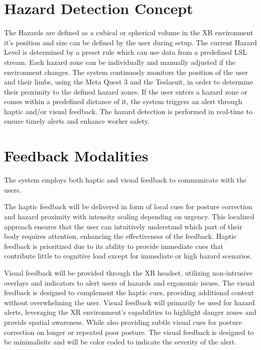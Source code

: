 \section{Hazard Detection Concept}
The Hazards are defined as a cubical or spherical volume in the XR environment it's position and size can be defined by the user during setup. The current Hazard Level is determined by a preset rule which can use data from a predefined LSL stream.
Each hazard zone can be individually and manually adjusted if the environment changes.
The system continuosly monitors the position of the user and their limbs, using the Meta Quest 3 and the Teslasuit, in order to determine their proximity to the defined hazard zones. If the user enters a hazard zone or comes within a predefined distance of it, the system triggers an alert through haptic and/or visual feedback. The hazard detection is performed in real-time to ensure timely alerts and enhance worker safety. 

\section{Feedback Modalities}
The system employs both haptic and visual feedback to communicate with the users. 

The haptic feedback will be delivered in form of local cues for posture correction and hazard proximity with intensity scaling depending on urgency. This localized approach ensures that the user can intuitively understand which part of their body requires attention, enhancing the effectiveness of the feedback. Haptic feedback is prioritized due to its ability to provide immediate cues that contribute little to cognitive load except for immediate or high hazard scenarios. 


Visual feedback will be provided through the XR headset, utilizing non-intrusive overlays and indicators to alert users of hazards and ergonomic issues. The visual feedback is designed to complement the haptic cues, providing additional context without overwhelming the user. Visual feedback will primarily be used for hazard alerts, leveraging the XR environment's capabilities to highlight danger zones and provide spatial awareness. While also providing subtle visual cues for posture correction on longer or repeated poor posture. The visual feedback is designed to be minimalisitc and will be color coded to indicate the severity of the alert.


